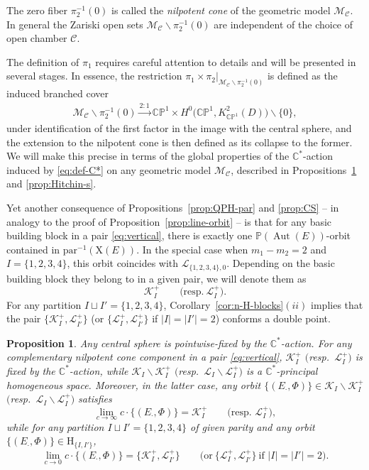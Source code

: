 \documentclass[10pt,a4paper]{amsart}
\newcommand{\field}[1]{\ensuremath{\mathbb{#1}}}
\newcommand{\CC}{\field{C}}
\newcommand{\PP}{\field{P}}
\newcommand{\curly}[1]{\mathscr{#1}}
\newcommand{\cK}{\curly{K}}
\newcommand{\cL}{\curly{L}}
\newcommand{\cM}{\curly{M}}
\newcommand{\qC}{\mathcal{C}}
\newcommand{\qp}{\boldsymbol{\cdot}}
\DeclareMathOperator{\Aut}{Aut}
\numberwithin{equation}{section}
\newtheorem{Proposition}[Theorem]{Proposition}
 { \theoremstyle{definition}
\newtheorem{Definition}[Theorem]{Definition}
\newtheorem{Note}[Theorem]{Note}
\newtheorem{Example}[Theorem]{Example}
\newtheorem{Remark}[Theorem]{Remark} }
\begin{document}
The zero fiber $\pi_{2}^{-1}(0)$ is called the \textit{nilpotent cone} of the geometric model $\cM_{\qC}$. In general the Zariski open sets $\cM_{\qC}\backslash \pi^{-1}_{2}(0)$ are independent of the choice of open chamber $\qC$.

The definition of $\pi_{1}$ requires careful attention to details and will be presented in several stages. In essence, the restriction $\pi_{1}\times\pi_{2}\vert_{\cM_{\qC}\backslash \pi^{-1}_{2}(0)}$ is defined as the induced branched cover
\begin{gather}\label{eq:branched-cover}
\cM_{\qC}\backslash \pi^{-1}_{2}(0)\xrightarrow{2:1} \CC\PP^{1}\times H^{0}\bigl(\CC\PP^{1},K^{2}_{\CC\PP^{1}}(D)\bigr)\backslash\{0\},
\end{gather}
under identification of the first factor in the image with the central sphere, and the extension to the nilpotent cone is then defined as its collapse to the former. We will make this precise in terms of the global properties of the $\CC^{*}$-action induced by \eqref{eq:def-C*} on any geometric model $\cM_{\qC}$, described in Propositions~\ref{prop:limits} and \ref{prop:Hitchin-s}.

Yet another consequence of Propositions~\ref{prop:QPH-par} and \ref{prop:CS} -- in analogy to the proof of Proposition~\ref{prop:line-orbit} -- is that for any basic building block in a pair \eqref{eq:vertical}, there is exactly one $\PP(\Aut(E))$-orbit contained in $\mathrm{par}^{-1}(\mathrm{X}(E))$. In the special case when $m_{1}-m_{2} = 2$ and $I= \{1,2,3,4\}$, this orbit coincides with $\cL_{\{1,2,3,4\},0}$. Depending on the basic building block they belong to in a given pair, we will denote them as
\[
\cK^{+}_{I}\qquad \big(\text{resp.} \ \cL^{+}_{I}\big).
\]
For any partition $I\sqcup I' = \{1,2,3,4\}$, Corollary~\ref{cor:n-H-blocks}$(ii)$ implies that the pair $\{\cK^{+}_{I},\cL^{+}_{I'}\}$ (or $\{\cL^{+}_{I},\cL^{+}_{I'}\}$ if $\vert I\vert =\vert I'\vert =2$) conforms a double point.

\begin{Proposition}\label{prop:limits}
Any central sphere is pointwise-fixed by the $\CC^{*}$-action.
For any complementary nilpotent cone component in a pair \eqref{eq:vertical}, $\cK^{+}_{I}$ $($resp.~$\cL^{+}_{I})$ is fixed by the $\CC^{*}$-action, while $\cK_{I}\backslash\cK_{I}^{+}$ $($resp.~$\cL_{I}\backslash\cL_{I}^{+})$ is a $\CC^{*}$-principal homogeneous space. Moreover, in the latter case, %
any orbit $\{(E_{\qp},\Phi)\}\in \cK_{I}\backslash\cK_{I}^{+}$ $($resp.~$\cL_{I}\backslash\cL_{I}^{+})$ satisfies
\[
\lim\limits_{c\to \infty}c\cdot\{(E_{\qp},\Phi)\} = \cK^{+}_{I}\qquad \big(\text{resp.~}\cL^{+}_{I}\big),
\]
while for any partition $I\sqcup I' = \{1,2,3,4\}$ of given parity and any orbit $\{(E_{\qp},\Phi)\}\in \mathrm{H}_{\{I,I'\}}$,
\[
\lim\limits_{c\to 0}c\cdot\{(E_{\qp},\Phi)\} = \big\{\cK^{+}_{I},\cL^{+}_{I'}\big\}\qquad \big(\text{or}\ \big\{\cL^{+}_{I},\cL^{+}_{I'}\big\}\ \text{if $\vert I\vert =\vert I'\vert =2$}\big).
\]
\end{Proposition}
\end{document}
